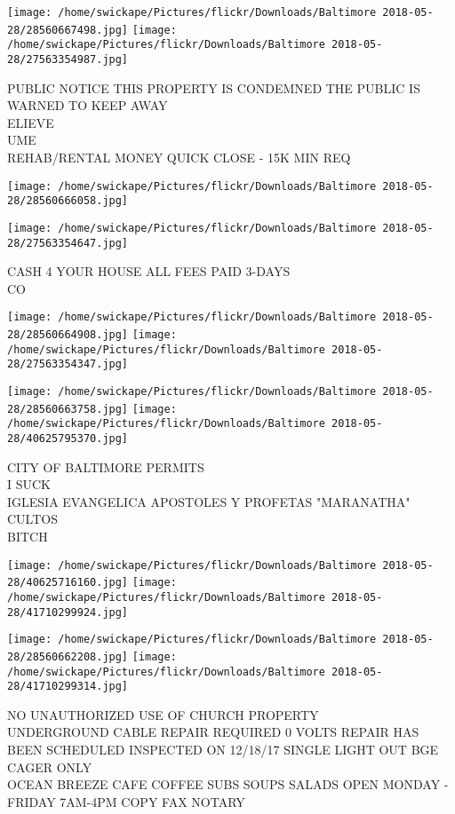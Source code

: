 \documentclass[10pt,letterpaper]{article}
\begin{document}
\texttt{[image: /home/swickape/Pictures/flickr/Downloads/Baltimore 2018-05-28/28560667498.jpg]}
\texttt{[image: /home/swickape/Pictures/flickr/Downloads/Baltimore 2018-05-28/27563354987.jpg]}

PUBLIC NOTICE THIS PROPERTY IS CONDEMNED THE PUBLIC IS WARNED TO KEEP AWAY\\
ELIEVE\\
UME\\
REHAB/RENTAL MONEY QUICK CLOSE {-} 15K MIN REQ
\pagebreak

\texttt{[image: /home/swickape/Pictures/flickr/Downloads/Baltimore 2018-05-28/28560666058.jpg]}

\vspace{0.25in}
\texttt{[image: /home/swickape/Pictures/flickr/Downloads/Baltimore 2018-05-28/27563354647.jpg]}

CASH 4 YOUR HOUSE ALL FEES PAID 3{-}DAYS\\
CO
\pagebreak

\texttt{[image: /home/swickape/Pictures/flickr/Downloads/Baltimore 2018-05-28/28560664908.jpg]}
\texttt{[image: /home/swickape/Pictures/flickr/Downloads/Baltimore 2018-05-28/27563354347.jpg]}

\texttt{[image: /home/swickape/Pictures/flickr/Downloads/Baltimore 2018-05-28/28560663758.jpg]}
\texttt{[image: /home/swickape/Pictures/flickr/Downloads/Baltimore 2018-05-28/40625795370.jpg]}

CITY OF BALTIMORE PERMITS\\
I SUCK\\
IGLESIA EVANGELICA APOSTOLES Y PROFETAS "MARANATHA" CULTOS\\
BITCH
\pagebreak

\texttt{[image: /home/swickape/Pictures/flickr/Downloads/Baltimore 2018-05-28/40625716160.jpg]}
\texttt{[image: /home/swickape/Pictures/flickr/Downloads/Baltimore 2018-05-28/41710299924.jpg]}

\texttt{[image: /home/swickape/Pictures/flickr/Downloads/Baltimore 2018-05-28/28560662208.jpg]}
\texttt{[image: /home/swickape/Pictures/flickr/Downloads/Baltimore 2018-05-28/41710299314.jpg]}

NO UNAUTHORIZED USE OF CHURCH PROPERTY\\
UNDERGROUND CABLE REPAIR REQUIRED 0 VOLTS REPAIR HAS BEEN SCHEDULED INSPECTED ON 12/18/17 SINGLE LIGHT OUT BGE\\
CAGER ONLY\\
OCEAN BREEZE CAFE COFFEE SUBS SOUPS SALADS OPEN MONDAY {-} FRIDAY 7AM{-}4PM COPY FAX NOTARY
\pagebreak
\end{document}
